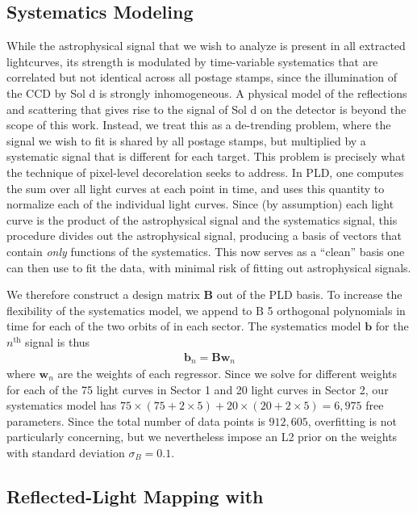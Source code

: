 \documentclass[modern]{aastex62}
\begin{document}
\subsection{Systematics Modeling}
\label{sec:systematics}

While the astrophysical signal that we wish to analyze is present in all 
extracted lightcurves, its strength is modulated by time-variable systematics 
that are correlated but not identical across all postage stamps, since the
illumination of the CCD by Sol d is strongly inhomogeneous. A physical
model of the reflections and scattering that gives rise to the
signal of Sol d on the \tess detector is beyond the scope of this work. Instead,
we treat this as a de-trending problem, where the signal we wish to fit is
shared by all postage stamps, but multiplied by a systematic signal that is
different for each target. This problem is precisely what the technique of
pixel-level decorelation \citep[PLD;][]{Deming2015, Luger2016, Luger2018a}
seeks to address. In PLD, one computes the sum over all light curves at each
point in time, and uses this quantity to normalize each of the individual
light curves. Since (by assumption) each light curve is the product of the astrophysical
signal and the systematics signal, this procedure divides out the astrophysical
signal, producing a basis of vectors that contain \emph{only} functions of the
systematics. This now serves as a ``clean'' basis one can then use to fit the
data, with minimal risk of fitting out astrophysical signals.

We therefore construct a design matrix $\mathbf{B}$ out of the PLD basis. To
increase the flexibility of the systematics model, we append to $\mathrm{B}$ 5 orthogonal
polynomials in time for each of the two orbits of \tess in each sector.
The systematics model $\mathbf{b}$ for the $n^\mathrm{th}$ signal is thus
%
\begin{align}
\mathbf{b}_n = \mathbf{B} \mathbf{w}_n
\end{align}
%
where $\mathbf{w}_n$ are the weights of each regressor.
Since we solve for different weights for each of the 75 light curves in Sector 1
and 20 light curves in Sector 2, our systematics model has
$75 \times (75 + 2 \times 5) + 20 \times (20 + 2 \times 5) = 6,975$ free parameters.
Since the total number of data points is $912,605$, overfitting is not particularly
concerning, but we nevertheless impose an L2 prior on the weights with
standard deviation $\sigma_B = 0.1$.

\subsection{Reflected-Light Mapping with \starry}
\label{sec:starry}
\end{document}
